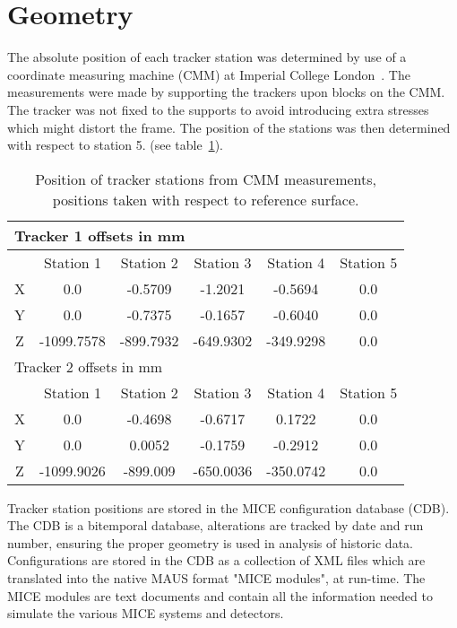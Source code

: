 \section{Geometry}
\label{sec:Geometry}

  The absolute position of each tracker station was determined by use of a coordinate measuring machine (CMM) at Imperial College London~\cite{MiceTrackers}.  The measurements were made by supporting the trackers upon blocks on the CMM. The tracker was not fixed to the supports to avoid introducing extra stresses which might distort the frame. The position of the stations was then determined with respect to station 5. (see table~\ref{tab:CMM}).
  
  \begin{table} [tbp]
  \begin{center}
  \begin{tabular} {|c|c|c|c|c|c|}
    \hline
    \multicolumn{6}{|l|}{Tracker 1 offsets in mm} \\
    \hline
    & Station 1 & Station 2 & Station 3 & Station 4 & Station 5 \\
    \hline
    X & 0.0 & -0.5709 & -1.2021 & -0.5694 & 0.0 \\
    Y & 0.0 & -0.7375 & -0.1657 & -0.6040 & 0.0 \\
    Z & -1099.7578 & -899.7932 & -649.9302 & -349.9298 & 0.0 \\
    \hline
    \hline
    \multicolumn{6}{|l|}{Tracker 2 offsets in mm} \\
    \hline
    & Station 1 & Station 2 & Station 3 & Station 4 & Station 5 \\
    \hline
    X & 0.0 & -0.4698 & -0.6717 & 0.1722 & 0.0 \\
    Y & 0.0 & 0.0052 & -0.1759 & -0.2912 & 0.0 \\
    Z & -1099.9026 & -899.009 & -650.0036 & -350.0742 & 0.0 \\
    \hline
  \end{tabular}
  \caption{\label{tab:CMM} Position of tracker stations from CMM measurements, positions taken with respect to reference surface.}
  \end{center}
  \end{table}
  
  Tracker station positions are stored in the MICE configuration database (CDB). The CDB is a bitemporal database, alterations are tracked by date and run number, ensuring the proper geometry is used in analysis of historic data.  Configurations are stored in the CDB as a collection of XML files which are translated into the native MAUS format "MICE modules", at run-time.  The MICE modules are text documents and contain all the information needed to simulate the various MICE systems and detectors.
  

